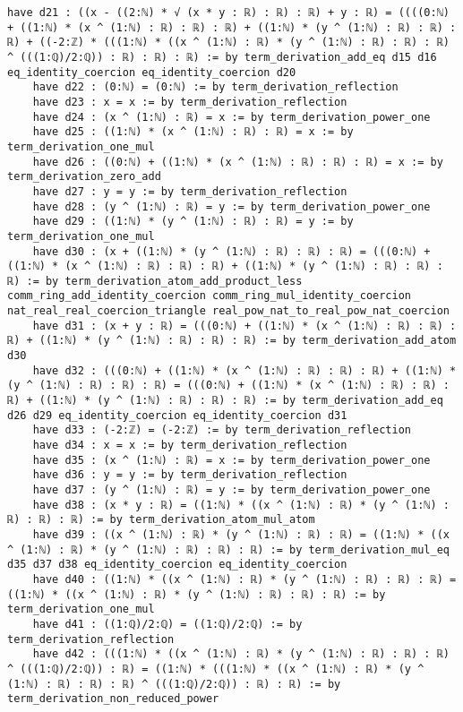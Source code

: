 \documentclass{article}
\begin{document}
\begin{tcolorbox}[colback=white!10, width=\linewidth]
\begin{lstlisting}[language=Lean4]
    have d21 : ((x - ((2:ℕ) * √ (x * y : ℝ) : ℝ) : ℝ) + y : ℝ) = ((((0:ℕ) + ((1:ℕ) * (x ^ (1:ℕ) : ℝ) : ℝ) : ℝ) + ((1:ℕ) * (y ^ (1:ℕ) : ℝ) : ℝ) : ℝ) + ((-2:ℤ) * (((1:ℕ) * ((x ^ (1:ℕ) : ℝ) * (y ^ (1:ℕ) : ℝ) : ℝ) : ℝ) ^ (((1:ℚ)/2:ℚ)) : ℝ) : ℝ) : ℝ) := by term_derivation_add_eq d15 d16 eq_identity_coercion eq_identity_coercion d20
    have d22 : (0:ℕ) = (0:ℕ) := by term_derivation_reflection
    have d23 : x = x := by term_derivation_reflection
    have d24 : (x ^ (1:ℕ) : ℝ) = x := by term_derivation_power_one
    have d25 : ((1:ℕ) * (x ^ (1:ℕ) : ℝ) : ℝ) = x := by term_derivation_one_mul
    have d26 : ((0:ℕ) + ((1:ℕ) * (x ^ (1:ℕ) : ℝ) : ℝ) : ℝ) = x := by term_derivation_zero_add
    have d27 : y = y := by term_derivation_reflection
    have d28 : (y ^ (1:ℕ) : ℝ) = y := by term_derivation_power_one
    have d29 : ((1:ℕ) * (y ^ (1:ℕ) : ℝ) : ℝ) = y := by term_derivation_one_mul
    have d30 : (x + ((1:ℕ) * (y ^ (1:ℕ) : ℝ) : ℝ) : ℝ) = (((0:ℕ) + ((1:ℕ) * (x ^ (1:ℕ) : ℝ) : ℝ) : ℝ) + ((1:ℕ) * (y ^ (1:ℕ) : ℝ) : ℝ) : ℝ) := by term_derivation_atom_add_product_less comm_ring_add_identity_coercion comm_ring_mul_identity_coercion nat_real_real_coercion_triangle real_pow_nat_to_real_pow_nat_coercion
    have d31 : (x + y : ℝ) = (((0:ℕ) + ((1:ℕ) * (x ^ (1:ℕ) : ℝ) : ℝ) : ℝ) + ((1:ℕ) * (y ^ (1:ℕ) : ℝ) : ℝ) : ℝ) := by term_derivation_add_atom d30
    have d32 : (((0:ℕ) + ((1:ℕ) * (x ^ (1:ℕ) : ℝ) : ℝ) : ℝ) + ((1:ℕ) * (y ^ (1:ℕ) : ℝ) : ℝ) : ℝ) = (((0:ℕ) + ((1:ℕ) * (x ^ (1:ℕ) : ℝ) : ℝ) : ℝ) + ((1:ℕ) * (y ^ (1:ℕ) : ℝ) : ℝ) : ℝ) := by term_derivation_add_eq d26 d29 eq_identity_coercion eq_identity_coercion d31
    have d33 : (-2:ℤ) = (-2:ℤ) := by term_derivation_reflection
    have d34 : x = x := by term_derivation_reflection
    have d35 : (x ^ (1:ℕ) : ℝ) = x := by term_derivation_power_one
    have d36 : y = y := by term_derivation_reflection
    have d37 : (y ^ (1:ℕ) : ℝ) = y := by term_derivation_power_one
    have d38 : (x * y : ℝ) = ((1:ℕ) * ((x ^ (1:ℕ) : ℝ) * (y ^ (1:ℕ) : ℝ) : ℝ) : ℝ) := by term_derivation_atom_mul_atom
    have d39 : ((x ^ (1:ℕ) : ℝ) * (y ^ (1:ℕ) : ℝ) : ℝ) = ((1:ℕ) * ((x ^ (1:ℕ) : ℝ) * (y ^ (1:ℕ) : ℝ) : ℝ) : ℝ) := by term_derivation_mul_eq d35 d37 d38 eq_identity_coercion eq_identity_coercion
    have d40 : ((1:ℕ) * ((x ^ (1:ℕ) : ℝ) * (y ^ (1:ℕ) : ℝ) : ℝ) : ℝ) = ((1:ℕ) * ((x ^ (1:ℕ) : ℝ) * (y ^ (1:ℕ) : ℝ) : ℝ) : ℝ) := by term_derivation_one_mul
    have d41 : ((1:ℚ)/2:ℚ) = ((1:ℚ)/2:ℚ) := by term_derivation_reflection
    have d42 : (((1:ℕ) * ((x ^ (1:ℕ) : ℝ) * (y ^ (1:ℕ) : ℝ) : ℝ) : ℝ) ^ (((1:ℚ)/2:ℚ)) : ℝ) = ((1:ℕ) * (((1:ℕ) * ((x ^ (1:ℕ) : ℝ) * (y ^ (1:ℕ) : ℝ) : ℝ) : ℝ) ^ (((1:ℚ)/2:ℚ)) : ℝ) : ℝ) := by term_derivation_non_reduced_power

\end{lstlisting}
\end{tcolorbox}
\end{document}
